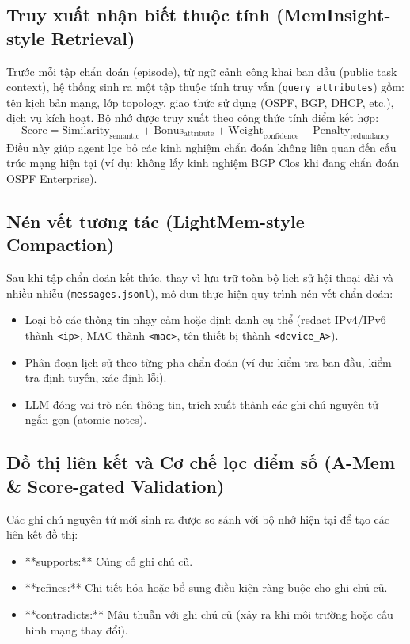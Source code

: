 \subsection{Truy xuất nhận biết thuộc tính (MemInsight-style Retrieval)}
Trước mỗi tập chẩn đoán (episode), từ ngữ cảnh công khai ban đầu (public task context), hệ thống sinh ra một tập thuộc tính truy vấn (\texttt{query\_attributes}) gồm: tên kịch bản mạng, lớp topology, giao thức sử dụng (OSPF, BGP, DHCP, etc.), dịch vụ kích hoạt.
Bộ nhớ được truy xuất theo công thức tính điểm kết hợp:
\begin{equation}
\text{Score} = \text{Similarity}_{\text{semantic}} + \text{Bonus}_{\text{attribute}} + \text{Weight}_{\text{confidence}} - \text{Penalty}_{\text{redundancy}}
\end{equation}
Điều này giúp agent lọc bỏ các kinh nghiệm chẩn đoán không liên quan đến cấu trúc mạng hiện tại (ví dụ: không lấy kinh nghiệm BGP Clos khi đang chẩn đoán OSPF Enterprise).

\subsection{Nén vết tương tác (LightMem-style Compaction)}
Sau khi tập chẩn đoán kết thúc, thay vì lưu trữ toàn bộ lịch sử hội thoại dài và nhiều nhiễu (\texttt{messages.jsonl}), mô-đun thực hiện quy trình nén vết chẩn đoán:
\begin{itemize}
    \item Loại bỏ các thông tin nhạy cảm hoặc định danh cụ thể (redact IPv4/IPv6 thành \texttt{<ip>}, MAC thành \texttt{<mac>}, tên thiết bị thành \texttt{<device\_A>}).
    \item Phân đoạn lịch sử theo từng pha chẩn đoán (ví dụ: kiểm tra ban đầu, kiểm tra định tuyến, xác định lỗi).
    \item LLM đóng vai trò nén thông tin, trích xuất thành các ghi chú nguyên tử ngắn gọn (atomic notes).
\end{itemize}

\subsection{Đồ thị liên kết và Cơ chế lọc điểm số (A-Mem \& Score-gated Validation)}
Các ghi chú nguyên tử mới sinh ra được so sánh với bộ nhớ hiện tại để tạo các liên kết đồ thị:
\begin{itemize}
    \item **supports:** Củng cố ghi chú cũ.
    \item **refines:** Chi tiết hóa hoặc bổ sung điều kiện ràng buộc cho ghi chú cũ.
    \item **contradicts:** Mâu thuẫn với ghi chú cũ (xảy ra khi môi trường hoặc cấu hình mạng thay đổi).
\end{itemize}

